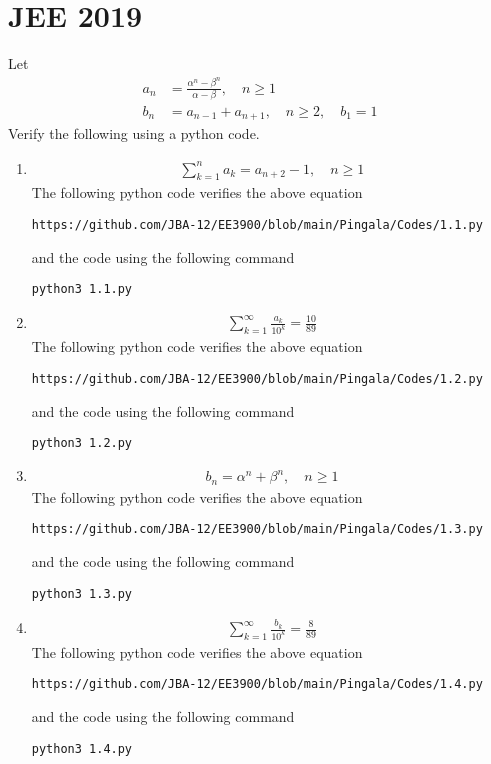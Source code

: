 \documentclass[journal,12pt,twocolumn]{IEEEtran}
\renewcommand\thesection{\arabic{section}}
\begin{document}
\section{JEE 2019}
Let 
\begin{align}
	a_n &= \frac{\alpha^{n}-\beta^{n}}{\alpha - \beta}, \quad n \ge 1
	\\
	b_n &= a_{n-1} + a_{n+1}, \quad n \ge 2, \quad b_1 =1
	\label{eq:10-orig-diff}
\end{align}
Verify the following using a python code.
\begin{enumerate}[label=\thesection.\arabic*
,ref=\thesection.\theenumi]
\item 
\begin{align}
	\sum_{k=1}^{n}a_k = a_{n+2}-1, \quad n \ge 1
\end{align}
\solution The following python code verifies the above equation
\begin{lstlisting}
https://github.com/JBA-12/EE3900/blob/main/Pingala/Codes/1.1.py
\end{lstlisting}
and the code using the following command 
\begin{lstlisting}
python3 1.1.py
\end{lstlisting}
 \item 
\begin{align}
	\sum_{k=1}^{\infty}\frac{a_k}{10^k} =\frac{10}{89}
\end{align}
\solution The following python code verifies the above equation
\begin{lstlisting}
https://github.com/JBA-12/EE3900/blob/main/Pingala/Codes/1.2.py
\end{lstlisting}
and the code using the following command 
\begin{lstlisting}
python3 1.2.py
\end{lstlisting}
 \item 
\begin{align}
	b_n =\alpha^n + \beta^n, \quad n \ge 1
\end{align}
\solution The following python code verifies the above equation
\begin{lstlisting}
https://github.com/JBA-12/EE3900/blob/main/Pingala/Codes/1.3.py
\end{lstlisting}
and the code using the following command 
\begin{lstlisting}
python3 1.3.py
\end{lstlisting}
 \item 
\begin{align}
	\sum_{k=1}^{\infty}\frac{b_k}{10^k} =\frac{8}{89}
\end{align}
\solution The following python code verifies the above equation
\begin{lstlisting}
https://github.com/JBA-12/EE3900/blob/main/Pingala/Codes/1.4.py
\end{lstlisting}
and the code using the following command 
\begin{lstlisting}
python3 1.4.py
\end{lstlisting}
\end{enumerate}
\end{document}
